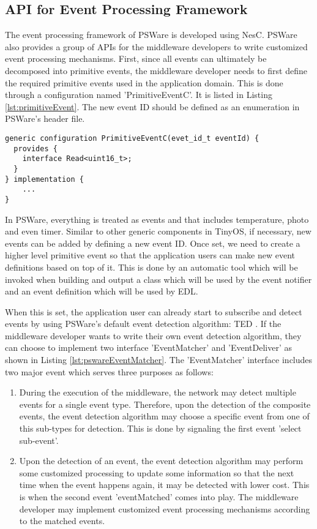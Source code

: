 \subsection{API for Event Processing Framework}
The event processing framework of PSWare is developed using NesC. PSWare also provides a group of APIs for the middleware developers to write customized event processing mechanisms. First, since all events can ultimately be decomposed into primitive events, the middleware developer needs to first define the required primitive events used in the application domain. This is done through a configuration named 'PrimitiveEventC'. It is listed in Listing \ref{lst:primitiveEvent}. The new event ID should be defined as an enumeration in PSWare's header file.
\begin{lstlisting}[caption=Primitive event component in NesC, label=lst:primitiveEvent]
generic configuration PrimitiveEventC(evet_id_t eventId) {
  provides {
    interface Read<uint16_t>;
  }
} implementation {
	...
}
\end{lstlisting}

In PSWare, everything is treated as events and that includes temperature, photo and even timer. Similar to other generic components in TinyOS, if necessary, new events can be added by defining a new event ID. Once set, we need to create a higher level primitive event so that the application users can make new event definitions based on top of it. This is done by an automatic tool which will be invoked when building and output a class which will be used by the event notifier and an event definition which will be used by EDL.

When this is set, the application user can already start to subscribe and detect events by using PSWare's default event detection algorithm: TED \cite{lai:ted}. If the middleware developer wants to write their own event detection algorithm, they can choose to implement two interface 'EventMatcher' and 'EventDeliver' as shown in Listing \ref{lst:pswareEventMatcher}. The 'EventMatcher' interface includes two major event which serves three purposes as follows:
\begin{enumerate}
\item During the execution of the middleware, the network may detect multiple events for a single event type. Therefore, upon the detection of the composite events, the event detection algorithm may choose a specific event from one of this sub-types for detection. This is done by signaling the first event 'select sub-event'.
\item Upon the detection of an event, the event detection algorithm may perform some customized processing to update some information so that the next time when the event happens again, it may be detected with lower cost. This is when the second event 'eventMatched' comes into play. The middleware developer may implement customized event processing mechanisms according to the matched events.
\end{enumerate}

